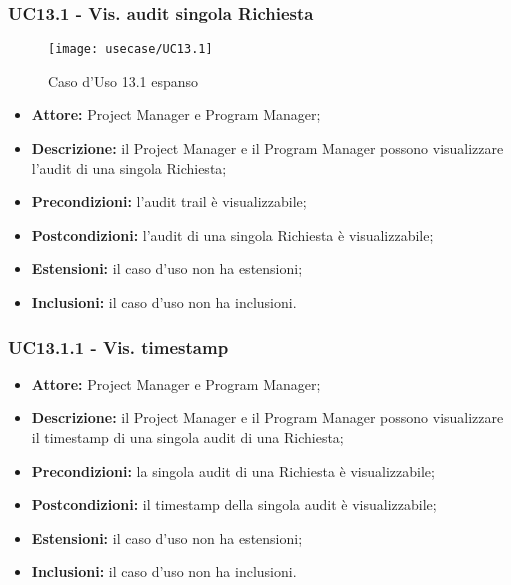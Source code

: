 \subsubsection*{UC13.1 - Vis. audit singola Richiesta}

\begin{figure}[H] 
    \centering 
    \texttt{[image: usecase/UC13.1]} 
    \caption{Caso d'Uso 13.1 espanso}
\end{figure}

\begin{itemize}[label=$\circ$]
\item \textbf{Attore:} Project Manager e Program Manager;
\item \textbf{Descrizione:} il Project Manager e il Program Manager possono visualizzare l'audit di una singola Richiesta;
\item \textbf{Precondizioni:} l'audit trail è visualizzabile;
\item \textbf{Postcondizioni:} l'audit di una singola Richiesta è visualizzabile;
\item \textbf{Estensioni:} il caso d'uso non ha estensioni;
\item \textbf{Inclusioni:} il caso d'uso non ha inclusioni.
\end{itemize}

\subsubsection*{UC13.1.1 - Vis. timestamp}
\begin{itemize}[label=$\circ$]
\item \textbf{Attore:} Project Manager e Program Manager;
\item \textbf{Descrizione:} il Project Manager e il Program Manager possono visualizzare il timestamp di una singola audit di una Richiesta;
\item \textbf{Precondizioni:} la singola audit di una Richiesta è visualizzabile;
\item \textbf{Postcondizioni:} il timestamp della singola audit è visualizzabile;
\item \textbf{Estensioni:} il caso d'uso non ha estensioni;
\item \textbf{Inclusioni:} il caso d'uso non ha inclusioni.
\end{itemize}

